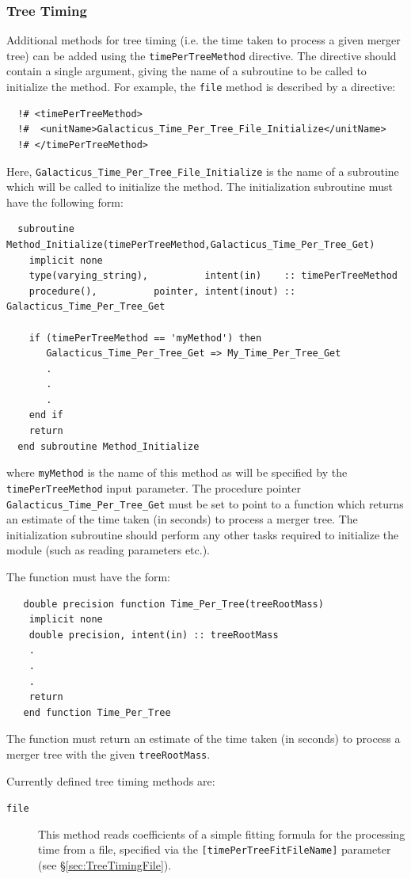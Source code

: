 \subsubsection{Tree Timing}

Additional methods for tree timing (i.e. the time taken to process a given merger tree) can be added using the {\tt timePerTreeMethod} directive. The directive should contain a single argument, giving the name of a subroutine to be called to initialize the method. For example, the {\tt file} method is described by a directive:
\begin{verbatim}
  !# <timePerTreeMethod>
  !#  <unitName>Galacticus_Time_Per_Tree_File_Initialize</unitName>
  !# </timePerTreeMethod>
\end{verbatim}
Here, {\tt Galacticus\_Time\_Per\_Tree\_File\_Initialize} is the name of a subroutine which will be called to initialize the method. The initialization subroutine must have the following form:
\begin{verbatim}
  subroutine Method_Initialize(timePerTreeMethod,Galacticus_Time_Per_Tree_Get)
    implicit none
    type(varying_string),          intent(in)    :: timePerTreeMethod
    procedure(),          pointer, intent(inout) :: Galacticus_Time_Per_Tree_Get
    
    if (timePerTreeMethod == 'myMethod') then
       Galacticus_Time_Per_Tree_Get => My_Time_Per_Tree_Get
       .
       .
       .
    end if
    return
  end subroutine Method_Initialize
\end{verbatim}
where {\tt myMethod} is the name of this method as will be specified by the {\tt timePerTreeMethod} input parameter. The procedure pointer {\tt Galacticus\_Time\_Per\_Tree\_Get} must be set to point to a function which returns an estimate of the time taken (in seconds) to process a merger tree. The initialization subroutine should perform any other tasks required to initialize the module (such as reading parameters etc.).

The function must have the form:
\begin{verbatim}
   double precision function Time_Per_Tree(treeRootMass)
    implicit none
    double precision, intent(in) :: treeRootMass
    .
    .
    .
    return
   end function Time_Per_Tree 
\end{verbatim}
The function must return an estimate of the time taken (in seconds) to process a merger tree with the given {\tt treeRootMass}.

Currently defined tree timing methods are:
\begin{description}
 \item [{\tt file}] This method reads coefficients of a simple fitting formula for the processing time from a file, specified via the {\tt [timePerTreeFitFileName]} parameter (see \S\ref{sec:TreeTimingFile}).
\end{description}

